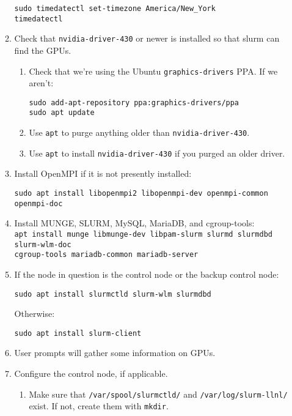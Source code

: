 \begin{enumerate}
\begin{enumerate}
		\texttt{sudo timedatectl set-timezone America/New\_York} \\
		\texttt{timedatectl}

	\item Check that \texttt{nvidia-driver-430} or newer is installed so that slurm can find the GPUs.

		\begin{enumerate}
		\item Check that we're using the Ubuntu \texttt{graphics-drivers} PPA. If we aren't:

			\texttt{sudo add-apt-repository ppa:graphics-drivers/ppa} \\
			\texttt{sudo apt update}

		\item Use \texttt{apt} to purge anything older than \texttt{nvidia-driver-430}.

		\item Use \texttt{apt} to install \texttt{nvidia-driver-430} if you purged an older driver.

		\end{enumerate}

	\item Install OpenMPI if it is not presently installed:

		\texttt{sudo apt install libopenmpi2 libopenmpi-dev openmpi-common openmpi-doc}

	\item Install MUNGE, SLURM, MySQL, MariaDB, and cgroup-tools: \\
		\texttt{apt install munge libmunge-dev libpam-slurm slurmd slurmdbd slurm-wlm-doc \\ cgroup-tools mariadb-common mariadb-server} %

	\item If the node in question is the control node or the backup control node:

		\texttt{sudo apt install slurmctld slurm-wlm slurmdbd}

		Otherwise:

		\texttt{sudo apt install slurm-client} 

	\item User prompts will gather some information on GPUs.

	\item Configure the control node, if applicable. 

		\begin{enumerate}
		\item Make sure that \texttt{/var/spool/slurmctld/} and \texttt{/var/log/slurm-llnl/} exist. If not, create them with \texttt{mkdir}.


\end{enumerate}
\end{enumerate}
\end{enumerate}
